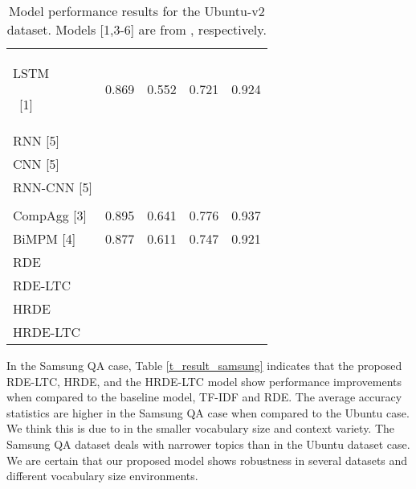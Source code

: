 \documentclass[11pt,a4paper]{article}
\newcommand\Tstrut{\rule{0pt}{2.0ex}}         \newcommand\Bstrut{\rule[-0.9ex]{0pt}{0pt}}
\begin{document}
\begin{table}[t]
\begin{tabular}{L{0.24\columnwidth}||C{0.125\columnwidth}|C{0.125\columnwidth}|C{0.125\columnwidth}|C{0.125\columnwidth}}
 LSTM\Tstrut~\scriptsize{[1]}
   & 0.869\Tstrut                           & 0.552\Tstrut  
   & 0.721\Tstrut                           & 0.924\Tstrut  \\

 RNN \scriptsize{[5]}
   &  &   
   &  &   \\
 
 CNN \scriptsize{[5]}
   &  & 
   &  &    \\
   
 RNN-CNN \scriptsize{[5]}
   &  & 
   &  &    \\

 
&  & 
   &  &    \\

 CompAgg \scriptsize{[3]}
   & 0.895                           & 0.641  
   & 0.776                           & 0.937  \\

 BiMPM \scriptsize{[4]}
   & 0.877                           & 0.611  
   & 0.747                           & 0.921  \\


\hline

 RDE\Tstrut 
   & \Tstrut & \Tstrut
   & \Tstrut & \Tstrut \\
   
 RDE-LTC
   &  & 
   &  &  \\
   
 HRDE
   &  & 
   &  &  \\
   
 HRDE-LTC
   &  &  
   &  &  \\
   
\hline

\hline
\end{tabular}
\caption{Model performance results for the Ubuntu-v2 dataset. Models [1,3-6] are from \cite{lowe2015ubuntu,wang2016compare,wang2017bilateral,baudivs2016sentence,tan2015lstm}, respectively.
}
\label{t_result_ubuntu_v2}
\end{table} 

In the Samsung QA case, Table \ref{t_result_samsung} indicates that the proposed RDE-LTC, HRDE, and the HRDE-LTC model show performance improvements when compared to the baseline model, TF-IDF and RDE. The average accuracy statistics are higher in the Samsung QA case when compared to the Ubuntu case. We think this is due to in the smaller vocabulary size and context variety. 
The Samsung QA dataset deals with narrower topics than in the Ubuntu dataset case. We are certain that our proposed model shows robustness in several datasets and different vocabulary  size environments.
\end{document}
